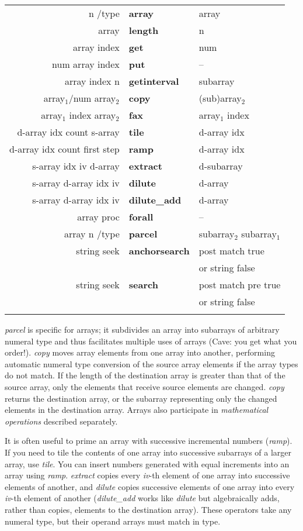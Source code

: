 \begin{tabular}{>{\sffamily}r>{\sffamily\bfseries}l>{\sffamily}l}
n /type & array & array\\
array & length & n\\
array index & get & num\\
num array index & put & --\\
array index n & getinterval & subarray\\
array$_1$/num array$_2$ & copy & (sub)array$_2$\\
array$_1$ index array$_2$ & fax & array$_1$ index\\
d-array idx count s-array & tile & d-array idx\\
d-array idx count first step & ramp & d-array idx\\
s-array idx iv d-array & extract & d-subarray\\
s-array d-array idx iv & dilute & d-array\\
s-array d-array idx iv &dilute\_add & d-array\\
array proc & forall & --\\
array n /type  & parcel & subarray$_2$ subarray$_1$\\
string seek & anchorsearch & post match true\\
            &              & or string false\\
string seek & search & post match pre true\\
            &        & or string false\\\\
\end{tabular}


\emph{parcel} is specific for arrays;  it subdivides an array into subarrays of arbitrary  numeral  type  and thus facilitates multiple  uses  of  arrays (Cave: you get what you order!). \emph{copy} moves  array elements from one array into another, performing automatic numeral  type conversion of the source array elements if the array types do not match. If the length of the destination array is greater than that of the source array, only the elements that receive source elements are changed. \emph{copy} returns the destination array, or the subarray representing only the changed elements in the destination array. Arrays  also participate in \emph{mathematical  operations}  described separately.

It is often useful to prime an array with successive incremental numbers (\emph{ramp}). If you need to tile the contents of one array into successive subarrays of a larger array, use \emph{tile}. You can insert numbers generated with equal increments into an array using \emph{ramp}. \emph{extract} copies every \emph{iv}-th element of one array into successive elements of another, and \emph{dilute} copies successive elements of one array into every \emph{iv}-th element of another (\emph{dilute\_add} works like \emph{dilute} but algebraically adds, rather than copies, elements to the destination array). These operators take any numeral type, but their operand arrays must match in type.  

